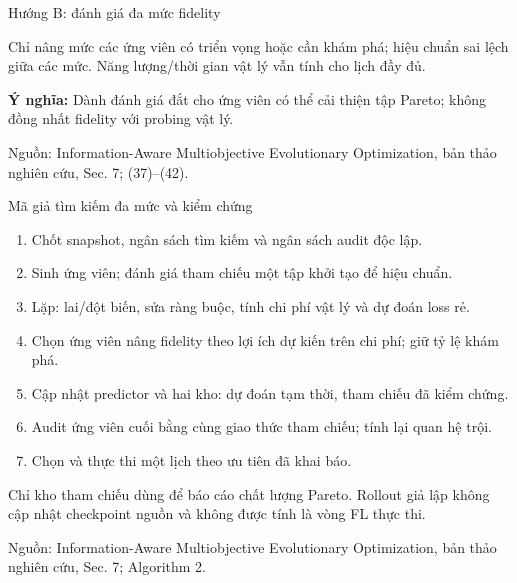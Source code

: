 \documentclass[10pt,aspectratio=43]{beamer}
\newcommand{\source}[1]{\par\vfill{\fontsize{5.8}{7}\selectfont\color{Muted}Nguồn: #1\par}}
\newcommand{\eqmeaning}[1]{\par\medskip\textcolor{HustRed}{\textbf{Ý nghĩa:}} #1\par}
\newcommand{\noteonly}[1]{\par{\footnotesize\color{Muted}#1\par}}
\begin{document}
\begin{frame}[t]{Hướng B: đánh giá đa mức fidelity}\relax
\small
\begin{center}\end{center}
Chỉ nâng mức các ứng viên có triển vọng hoặc cần khám phá; hiệu chuẩn sai lệch giữa các mức. Năng lượng/thời gian vật lý vẫn tính cho lịch đầy đủ.
\eqmeaning{Dành đánh giá đắt cho ứng viên có thể cải thiện tập Pareto; không đồng nhất fidelity với probing vật lý.}
\source{Information-Aware Multiobjective Evolutionary Optimization, bản thảo nghiên cứu, Sec. 7; (37)--(42).}
\end{frame}

\begin{frame}[t]{Mã giả tìm kiếm đa mức và kiểm chứng}\relax
\small
\begin{enumerate}\item Chốt snapshot, ngân sách tìm kiếm và ngân sách audit độc lập.
\item Sinh ứng viên; đánh giá tham chiếu một tập khởi tạo để hiệu chuẩn.
\item Lặp: lai/đột biến, sửa ràng buộc, tính chi phí vật lý và dự đoán loss rẻ.
\item Chọn ứng viên nâng fidelity theo lợi ích dự kiến trên chi phí; giữ tỷ lệ khám phá.
\item Cập nhật predictor và hai kho: dự đoán tạm thời, tham chiếu đã kiểm chứng.
\item Audit ứng viên cuối bằng cùng giao thức tham chiếu; tính lại quan hệ trội.
\item Chọn và thực thi một lịch theo ưu tiên đã khai báo.
\end{enumerate}
\noteonly{Chỉ kho tham chiếu dùng để báo cáo chất lượng Pareto. Rollout giả lập không cập nhật checkpoint nguồn và không được tính là vòng FL thực thi.}
\source{Information-Aware Multiobjective Evolutionary Optimization, bản thảo nghiên cứu, Sec. 7; Algorithm 2.}
\end{frame}
\end{document}
